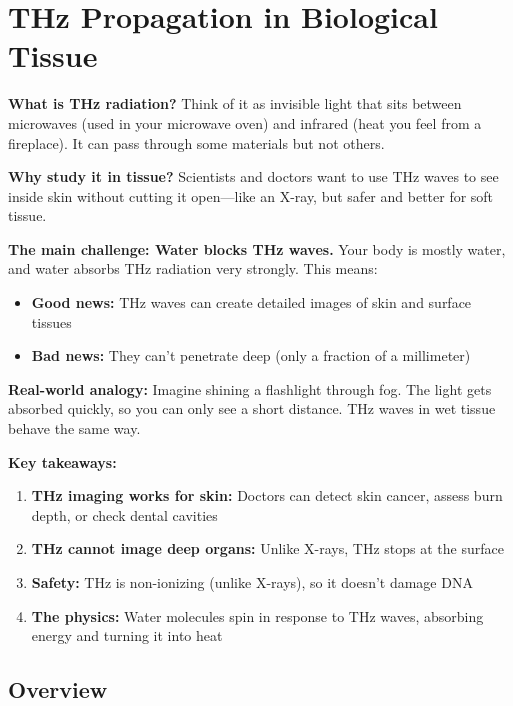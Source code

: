 \chapter{THz Propagation in Biological Tissue}
\label{ch:thz-propagation-biological-tissue}

\begin{nontechnical}
\textbf{What is THz radiation?} Think of it as invisible light that sits between microwaves (used in your microwave oven) and infrared (heat you feel from a fireplace). It can pass through some materials but not others.

\textbf{Why study it in tissue?} Scientists and doctors want to use THz waves to see inside skin without cutting it open---like an X-ray, but safer and better for soft tissue.

\textbf{The main challenge: Water blocks THz waves.} Your body is mostly water, and water absorbs THz radiation very strongly. This means:
\begin{itemize}
\item \textbf{Good news:} THz waves can create detailed images of skin and surface tissues
\item \textbf{Bad news:} They can't penetrate deep (only a fraction of a millimeter)
\end{itemize}

\textbf{Real-world analogy:} Imagine shining a flashlight through fog. The light gets absorbed quickly, so you can only see a short distance. THz waves in wet tissue behave the same way.

\textbf{Key takeaways:}
\begin{enumerate}
\item \textbf{THz imaging works for skin:} Doctors can detect skin cancer, assess burn depth, or check dental cavities
\item \textbf{THz cannot image deep organs:} Unlike X-rays, THz stops at the surface
\item \textbf{Safety:} THz is non-ionizing (unlike X-rays), so it doesn't damage DNA
\item \textbf{The physics:} Water molecules spin in response to THz waves, absorbing energy and turning it into heat
\end{enumerate}
\end{nontechnical}

\section{Overview}
\label{sec:thz-overview}

